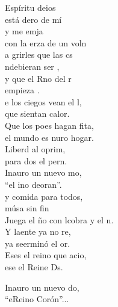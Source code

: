\begin{cancion}%
	 Espíritu deios\\
	está dero de mí\\
	y me emja\\
	con la erza de un voln\\
	a grirles que las cs\\
	ndebieran ser , \\
	y que el Rno del r\\
	empieza .\\
	e los ciegos vean el l,\\
	que sientan  calor.\\
	Que los poes hagan fita,\\
	el mundo es nuro hogar.\\
	Liberd al oprim,\\
	para dos el pern.\\
	Inauro un nuevo mo,\\
	“el ino deoran”. \\
	y comida para todos,\\
	músa sin fin\\
	Juega el ño con lcobra y el n. \\
	Y laente ya no re,\\
	ya seerminó el or.\\
	Eses el reino que acio,\\
	ese  el Reine Ds.\\
	\begin{chorus}%
	Inauro un nuevo do,\\
	“eReino  Corón”...\\
	\end{chorus}%
\end{cancion}%

